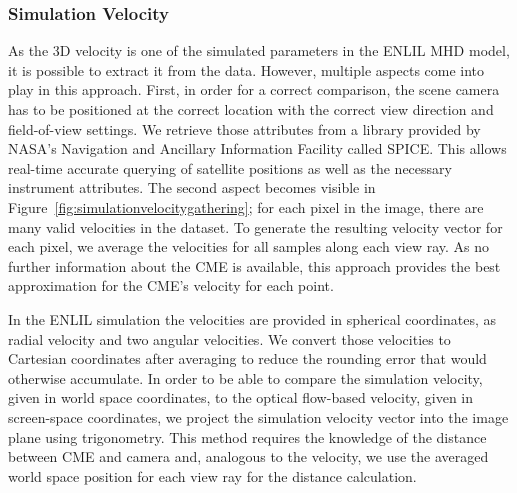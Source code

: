 \documentclass[journal]{vgtc}                %
\begin{document}
\subsubsection{Simulation Velocity} \label{sec:simulationvelocity}
As the 3D velocity is one of the simulated parameters in the ENLIL MHD model, it is possible to extract it from the data. However, multiple aspects come into play in this approach. First, in order for a correct comparison, the scene camera has to be positioned at the correct location with the correct view direction and field-of-view settings. We retrieve those attributes from a library provided by NASA's Navigation and Ancillary Information Facility called SPICE. This allows real-time accurate querying of satellite positions as well as the necessary instrument attributes. The second aspect becomes visible in Figure~\ref{fig:simulationvelocitygathering}; for each pixel in the image, there are many valid velocities in the dataset. To generate the resulting velocity vector for each pixel, we average the velocities for all samples along each view ray. As no further information about the CME is available, this approach provides the best approximation for the CME's velocity for each point.

In the ENLIL simulation the velocities are provided in spherical coordinates, as radial velocity and two angular velocities. We convert those velocities to Cartesian coordinates after averaging to reduce the rounding error that would otherwise accumulate. In order to be able to compare the simulation velocity, given in world space coordinates, to the optical flow-based velocity, given in screen-space coordinates, we project the simulation velocity vector into the image plane using trigonometry. This method requires the knowledge of the distance between CME and camera and, analogous to the velocity, we use the averaged world space position for each view ray for the distance calculation. 
\end{document}

